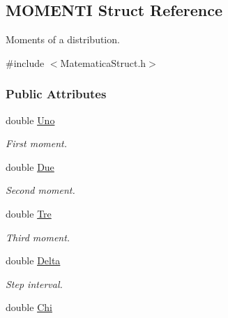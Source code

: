\hypertarget{structMOMENTI}{\subsection{\-M\-O\-M\-E\-N\-T\-I \-Struct \-Reference}
\label{structMOMENTI}
}


\-Moments of a distribution.  




{\ttfamily \#include $<$\-Matematica\-Struct.\-h$>$}

\subsubsection*{\-Public \-Attributes}
\begin{DoxyCompactItemize}
\item 
\hypertarget{structMOMENTI_ace35fa89d42816a5d3c59ff882b65e4c}{double \hyperlink{structMOMENTI_ace35fa89d42816a5d3c59ff882b65e4c}{\-Uno}}\label{structMOMENTI_ace35fa89d42816a5d3c59ff882b65e4c}

\begin{DoxyCompactList}\small\item\em \-First moment. \end{DoxyCompactList}\item 
\hypertarget{structMOMENTI_a15d9d06c593c6771637966bd64f78b6f}{double \hyperlink{structMOMENTI_a15d9d06c593c6771637966bd64f78b6f}{\-Due}}\label{structMOMENTI_a15d9d06c593c6771637966bd64f78b6f}

\begin{DoxyCompactList}\small\item\em \-Second moment. \end{DoxyCompactList}\item 
\hypertarget{structMOMENTI_abfbb9b4d7abdcac6679c9c91109bfc6b}{double \hyperlink{structMOMENTI_abfbb9b4d7abdcac6679c9c91109bfc6b}{\-Tre}}\label{structMOMENTI_abfbb9b4d7abdcac6679c9c91109bfc6b}

\begin{DoxyCompactList}\small\item\em \-Third moment. \end{DoxyCompactList}\item 
\hypertarget{structMOMENTI_a8466803d0c40a49457299b39f72651fe}{double \hyperlink{structMOMENTI_a8466803d0c40a49457299b39f72651fe}{\-Delta}}\label{structMOMENTI_a8466803d0c40a49457299b39f72651fe}

\begin{DoxyCompactList}\small\item\em \-Step interval. \end{DoxyCompactList}\item 
\hypertarget{structMOMENTI_a5fd19409bf55b66fb6743f0c17f4ecd5}{double \hyperlink{structMOMENTI_a5fd19409bf55b66fb6743f0c17f4ecd5}{\-Chi}}\label{structMOMENTI_a5fd19409bf55b66fb6743f0c17f4ecd5}


\end{DoxyCompactItemize}
